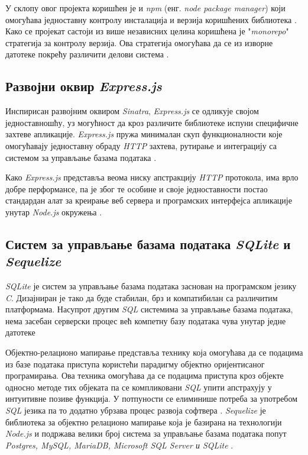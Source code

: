 \documentclass[12pt,oneside]{memoir}
\begin{document}
У склопу овог пројекта коришћен је и \textit{npm} (енг. \textit{node package manager}) који омогућава једноставну контролу инсталација и верзија коришћених библиотека \cite{npm}. Како се пројекат састоји из више независних целина коришћена је "\textit{monorepo}" стратегија за контролу верзија. Ова стратегија омогућава да се из изворне датотеке покрећу различити делови система \cite{monorepo}.

\subsection{Развојни оквир \textit{Express.js}}

Инспирисан развојним оквиром \textit{Sinatra}, \textit{Express.js} се одликује својом једноставношћу, уз могућност да кроз различите библиотеке испуни специфичне захтеве апликације. \textit{Express.js} пружа минималан скуп функционалности које омогућавају једноставну обраду \textit{HTTP} захтева, рутирање и интеграцију са системом за управљање базама података \cite{express}. 

Како \textit{Express.js} представља веома ниску апстракцију \textit{HTTP} протокола, има врло добре перформансе, па је због те особине и своје једноставности постао стандардан алат за креирање веб сервера и програмских интерфејса апликације унутар \textit{Node.js }окружења \cite{mdnexpress}.

\subsection{Систем за управљање базама података \textit{SQLite} и \textit{Sequelize}}

\textit{SQLite} је систем за управљање базама података заснован на програмском језику \textit{C}. Дизајниран је тако да буде стабилан, брз и компатибилан са различитим платформама.  Насупрот другим \textit{SQL} системима за управљање базама података, нема засебан серверски процес већ компетну базу података чува унутар једне датотеке \cite{sqlite,sqlitetutorial}

Објектно-релационо мапирање представља технику која омогућава да се подацима из базе података приступа користећи парадигму објектно оријентисаног програмирања. Ова техника омогућава да се подацима приступа кроз објекте односно методе тих објеката па се компликовани \textit{SQL} упити апстрахују у интуитивне позиве функција. У потпуности се елиминише потреба за употребом \textit{SQL} језика па то додатно убрзава процес развоја софтвера \cite{orm}. \textit{Sequelize} је библиотека за објектно релационо мапирање која је базирана на технологији \textit{ Node.js} и подржава велики број система за управљање базама података попут \textit{Postgres, MySQL, MariaDB, Microsoft SQL Server и SQLite} \cite{sequelize}.
\end{document}
